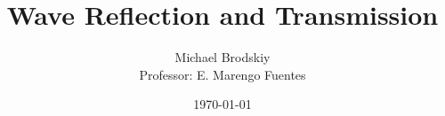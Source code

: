 


\title{Wave Reflection and Transmission}
\date{\today}
\author{Michael Brodskiy\\ \small Professor: E. Marengo Fuentes}



\maketitle

